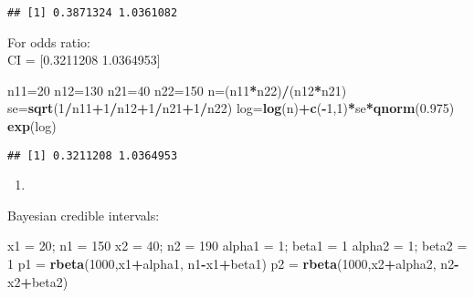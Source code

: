 \documentclass[]{article}
\newenvironment{Shaded}{\begin{snugshade}}{\end{snugshade}}
\newcommand{\KeywordTok}[1]{\textcolor[rgb]{0.13,0.29,0.53}{\textbf{#1}}}
\newcommand{\DecValTok}[1]{\textcolor[rgb]{0.00,0.00,0.81}{#1}}
\newcommand{\FloatTok}[1]{\textcolor[rgb]{0.00,0.00,0.81}{#1}}
\newcommand{\StringTok}[1]{\textcolor[rgb]{0.31,0.60,0.02}{#1}}
\newcommand{\OperatorTok}[1]{\textcolor[rgb]{0.81,0.36,0.00}{\textbf{#1}}}
\newcommand{\NormalTok}[1]{#1}
\begin{document}
\begin{verbatim}
## [1] 0.3871324 1.0361082
\end{verbatim}

For odds ratio:\\
CI = {[}0.3211208 1.0364953{]}

\begin{Shaded}
\begin{Highlighting}[]
\NormalTok{n11=}\DecValTok{20}
\NormalTok{n12=}\DecValTok{130}
\NormalTok{n21=}\DecValTok{40}
\NormalTok{n22=}\DecValTok{150}
\NormalTok{n=(n11}\OperatorTok{*}\NormalTok{n22)}\OperatorTok{/}\NormalTok{(n12}\OperatorTok{*}\NormalTok{n21)}
\NormalTok{se=}\KeywordTok{sqrt}\NormalTok{(}\DecValTok{1}\OperatorTok{/}\NormalTok{n11}\OperatorTok{+}\DecValTok{1}\OperatorTok{/}\NormalTok{n12}\OperatorTok{+}\DecValTok{1}\OperatorTok{/}\NormalTok{n21}\OperatorTok{+}\DecValTok{1}\OperatorTok{/}\NormalTok{n22)}
\NormalTok{log=}\KeywordTok{log}\NormalTok{(n)}\OperatorTok{+}\KeywordTok{c}\NormalTok{(}\OperatorTok{-}\DecValTok{1}\NormalTok{,}\DecValTok{1}\NormalTok{)}\OperatorTok{*}\NormalTok{se}\OperatorTok{*}\KeywordTok{qnorm}\NormalTok{(}\FloatTok{0.975}\NormalTok{)}
\KeywordTok{exp}\NormalTok{(log)}
\end{Highlighting}
\end{Shaded}

\begin{verbatim}
## [1] 0.3211208 1.0364953
\end{verbatim}

\begin{enumerate}
\def\labelenumi{\alph{enumi}.}
\setcounter{enumi}{2}
\item
\end{enumerate}

Bayesian credible intervals:

\begin{Shaded}
\begin{Highlighting}[]
\NormalTok{x1 =}\StringTok{ }\DecValTok{20}\NormalTok{; n1 =}\StringTok{ }\DecValTok{150}
\NormalTok{x2 =}\StringTok{ }\DecValTok{40}\NormalTok{; n2 =}\StringTok{ }\DecValTok{190}
\NormalTok{alpha1 =}\StringTok{ }\DecValTok{1}\NormalTok{; beta1 =}\StringTok{ }\DecValTok{1}
\NormalTok{alpha2 =}\StringTok{ }\DecValTok{1}\NormalTok{; beta2 =}\StringTok{ }\DecValTok{1}
\NormalTok{p1 =}\StringTok{ }\KeywordTok{rbeta}\NormalTok{(}\DecValTok{1000}\NormalTok{,x1}\OperatorTok{+}\NormalTok{alpha1, n1}\OperatorTok{-}\NormalTok{x1}\OperatorTok{+}\NormalTok{beta1)}
\NormalTok{p2 =}\StringTok{ }\KeywordTok{rbeta}\NormalTok{(}\DecValTok{1000}\NormalTok{,x2}\OperatorTok{+}\NormalTok{alpha2, n2}\OperatorTok{-}\NormalTok{x2}\OperatorTok{+}\NormalTok{beta2)}
\end{Highlighting}
\end{Shaded}
\end{document}
